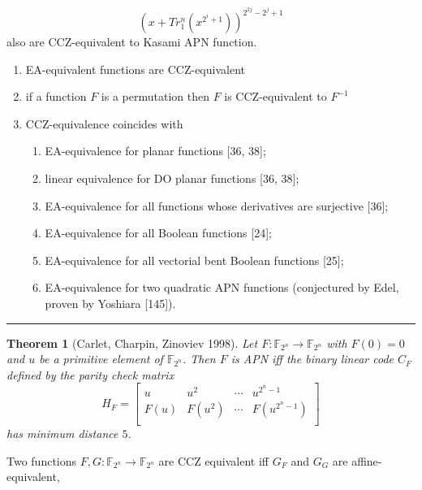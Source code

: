 \documentclass[8pt,oneside]{article}
\newcommand{\0}{\textbf{0}}
\newcommand{\1}{\textbf{1}}
\newcommand{\F}{\mathbb{F}}
\newtheorem{theorem}{Theorem}
\begin{document}
    
    \[\left(x+Tr^n_1\left(x^{2^i+1}\right)\right)^{2^{2j}-2^j+1}\]
    also are CCZ-equivalent to Kasami APN function.

    
    \begin{enumerate}
        \item EA-equivalent functions are CCZ-equivalent
        \item if a function $F$ is a permutation then $F$ is CCZ-equivalent to $F^{-1}$\cite{carlet1998codes}
        \item CCZ-equivalence coincides with\begin{enumerate}
            \item EA-equivalence for planar functions [36, 38];
            \item linear equivalence for DO planar functions [36, 38];
            \item EA-equivalence for all functions whose derivatives are surjective [36];
            \item EA-equivalence for all Boolean functions [24];
            \item EA-equivalence for all vectorial bent Boolean functions [25];
            \item EA-equivalence for two quadratic APN functions (conjectured by Edel,
            proven by Yoshiara [145]).
        \end{enumerate}
    \end{enumerate}
    \noindent\rule{\linewidth}{0.4pt}

    \begin{theorem}[Carlet, Charpin, Zinoviev 1998]
        Let $ F:\F_{2^n}\rightarrow\F_{2^n} $ with $ F(0)=0 $ and $ u $ be a primitive element of 
        $ \F_{2^n} $. Then $ F $ is APN iff the binary linear code $ C_F $ defined by the 
        parity check matrix
        \[H_F=\begin{bmatrix}
            u&u^2&\cdots&u^{2^n-1}\\
            F(u)&F(u^2)&\cdots&F(u^{2^n-1})\\
        \end{bmatrix}\]
        has minimum distance $ 5 $.
    \end{theorem}

    Two functions $ F,G:\F_{2^n}\rightarrow\F_{2^n} $ are CCZ equivalent iff
    $ G_F $ and $ G_G $ are affine-equivalent,
\end{document}
